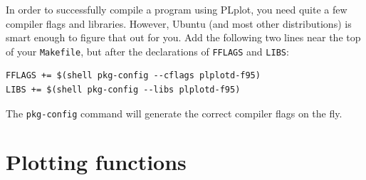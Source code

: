 \documentclass[openany,oneside]{report}
\begin{document}
In order to successfully compile a program using PLplot, you need quite a few compiler flags and libraries.
However, Ubuntu (and most other distributions) is smart enough to figure that out for you.
Add the following two lines near the top of your \texttt{Makefile}, but after the declarations of \texttt{FFLAGS} and \texttt{LIBS}:
\begin{verbatim}
FFLAGS += $(shell pkg-config --cflags plplotd-f95)
LIBS += $(shell pkg-config --libs plplotd-f95)
\end{verbatim}
The \texttt{pkg-config} command will generate the correct compiler flags on the fly.

\section{Plotting functions}
\end{document}
